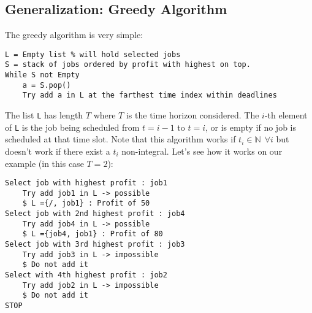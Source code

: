 %

\subsection{Generalization: Greedy Algorithm}

The greedy algorithm is very simple:

\begin{lstlisting}[label={list:c6:SchedulingGreedy},caption=Pseudo-code of the greedy algorithm for scheduling problem]
L = Empty list % will hold selected jobs
S = stack of jobs ordered by profit with highest on top.
While S not Empty
	a = S.pop()
	Try add a in L at the farthest time index within deadlines
\end{lstlisting}

The list \texttt{L} has length $T$ where $T$ is the time horizon considered. The $i$-th element of \texttt{L} is the job being scheduled from $t = i-1$ to $t = i$, or is empty if no job is scheduled at that time slot. Note that this algorithm works if $t_i \in \mathbb{N} \: \: \forall i$ but doesn’t work if there exist a $t_i$ non-integral. Let's see how it works on our example (in this case $T = 2$):

\begin{lstlisting}[label={list:c6:SchedulingGreedy_Example},caption=Example of the greedy algorithm for scheduling problem]
Select job with highest profit : job1
	Try add job1 in L -> possible
	$ L ={/, job1} : Profit of 50
Select job with 2nd highest profit : job4
	Try add job4 in L -> possible
	$ L ={job4, job1} : Profit of 80
Select job with 3rd highest profit : job3
	Try add job3 in L -> impossible
	$ Do not add it
Select with 4th highest profit : job2
	Try add job2 in L -> impossible
	$ Do not add it
STOP
\end{lstlisting}

